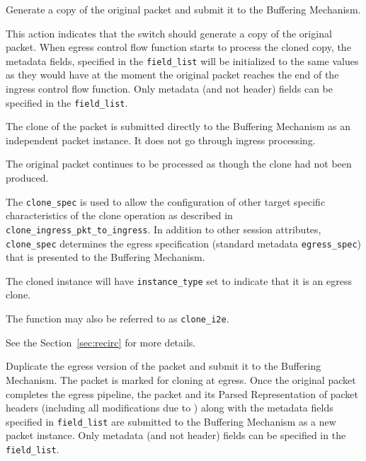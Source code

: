 \documentclass[12pt]{article}
\begin{document}
{ %
Generate a copy of the original packet and submit it to the Buffering Mechanism.
}
{ %
}
{ %
{
This action indicates that the switch should generate a copy of the original packet. When egress control flow function starts to process the cloned copy, the metadata fields, specified in the \texttt{field_list} will be initialized to the same values as they would have at the moment the original packet reaches the end of the ingress control flow function. Only metadata (and not header) fields can be specified in the \texttt{field_list}.
}

The clone of the packet is submitted directly to the Buffering Mechanism as 
an independent packet instance. It does not go through ingress \matchaction 
processing.

The original packet continues to be processed as though the clone had not 
been produced.

The \texttt{clone_spec} is used to allow the configuration of other target specific 
characteristics of the clone operation as described in \texttt{clone_ingress_pkt_to_ingress}. 
In addition to other session attributes, \texttt{clone_spec} determines the egress 
specification (standard metadata \texttt{egress_spec}) that is presented to the 
Buffering Mechanism.

The cloned instance will have \texttt{instance_type} set to indicate that it is an 
egress clone. 

The function may also be referred to as \texttt{clone_i2e}.

See the Section~\ref{sec:recirc} for more details.

}


{ %
Duplicate the egress version of the packet and submit it to the Buffering 
Mechanism.
}
{ %
}
{ %
The packet is marked for cloning at egress. Once the original packet completes 
the egress pipeline, the packet and its Parsed Representation of packet headers 
(including all modifications due to \matchaction) along with the metadata 
fields specified in \texttt{field_list} are submitted to the Buffering Mechanism as 
a new packet instance. Only metadata (and not header) fields can be specified in the \texttt{field_list}.
}
\end{document}

